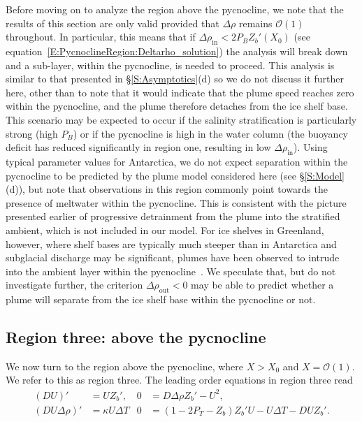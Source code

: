 \documentclass[openacc]{rsproca_new}%
\newcommand{\order}[1]{\mathcal{O}(#1)}
\newcommand{\Pb}{\textit{P}_B}  %
\newcommand{\Pt}{\textit{P}_T}
\renewcommand{\in}{\text{in}} %
\newcommand{\out}{\text{out}}
\begin{document}
Before moving on to analyze the  region above the pycnocline, we note that the results of this section are only valid provided that $\Delta \rho$ remains $\order{1}$ throughout. In particular, this means that if $\Delta \rho_{\in} < 2 \Pb Z_b'(X_0)$ (see equation~\eqref{E:PycnoclineRegion:Deltarho_solution}) the analysis will break down and a sub-layer, within the pycnocline, is needed to proceed. This analysis is similar to that presented in \S\ref{S:Asymptotics}(d) so we do not discuss it further here, other than to note that it would indicate that the plume speed reaches zero within the pycnocline, and the plume therefore detaches from the ice shelf base. This scenario may be expected to occur if the salinity stratification is particularly strong (high $\Pb$) or if the pycnocline is high in the water column (the buoyancy deficit has reduced significantly in region one, resulting in low $\Delta \rho_{\in}$). Using typical parameter values for Antarctica, we do not expect separation within the pycnocline to be predicted by the plume model considered here (see \S\ref{S:Model}(d)), but note that observations in this region commonly point towards the presence of meltwater within the pycnocline. This is consistent with the picture presented earlier of progressive detrainment from the plume into the stratified ambient, which is not included in our model. For ice shelves in Greenland, however, where shelf bases are typically much steeper than in Antarctica and subglacial discharge may be significant, plumes have been observed to intrude into the ambient layer within the pycnocline~\citep{Straneo2011NatureGeo}. We speculate that, but do not investigate further, the criterion $\Delta \rho_\out < 0$  may be able to predict whether a plume will separate from the ice shelf base within the pycnocline or not.

\subsection{Region three: above the pycnocline}\label{S:Asymptotics:Region3}
We now turn to the region above the pycnocline,  where $X > X_0$ and $X = \order{1}$. We refer to this as region three. The leading order equations in region three read
\begin{align}
 (DU)' &= U Z_b', &
0 &= D \Delta \rho Z_b' - U^2, \label{E:Region3:mass}\\
(DU\Delta \rho)'  &=\kappa U \Delta T &
0&= (1  - 2\Pt -  Z_b)Z_b'U- U\Delta T - DU Z_b'.\label{E:Region3:thermal}
\end{align}
\end{document}
